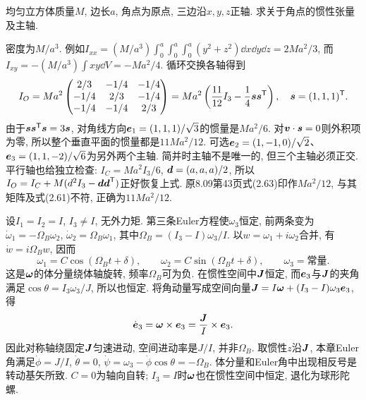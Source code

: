 \begin{example}
均匀立方体质量$M$, 边长$a$, 角点为原点, 三边沿$x,y,z$正轴. 求关于角点的惯性张量及主轴.
\end{example}
\begin{solution}
密度为$M/a^3$. 例如$I_{xx}=(M/a^3)\int_0^a\int_0^a\int_0^a(y^2+z^2)\dd x\dd y\dd z=2Ma^2/3$, 而$I_{xy}=-(M/a^3)\int xy\dd V=-Ma^2/4$. 循环交换各轴得到
\[
I_O=Ma^2\begin{pmatrix}2/3&-1/4&-1/4\\-1/4&2/3&-1/4\\-1/4&-1/4&2/3\end{pmatrix}
=Ma^2\left(\frac{11}{12}I_3-\frac14\boldsymbol{s}\boldsymbol{s}^{\mathsf T}\right),\quad
\boldsymbol{s}=(1,1,1)^{\mathsf T}.
\]
由于$\boldsymbol{s}\boldsymbol{s}^{\mathsf T}\boldsymbol{s}=3\boldsymbol{s}$, 对角线方向$\boldsymbol{e}_1=(1,1,1)/\sqrt3$的惯量是$Ma^2/6$. 对$\boldsymbol{v}\cdot\boldsymbol{s}=0$则外积项为零, 所以整个垂直平面的惯量都是$11Ma^2/12$. 可选$\boldsymbol{e}_2=(1,-1,0)/\sqrt2$、$\boldsymbol{e}_3=(1,1,-2)/\sqrt6$为另外两个主轴. 简并时主轴不是唯一的, 但三个主轴必须正交. 平行轴也给独立检查: $I_C=Ma^2I_3/6$, $\boldsymbol{d}=(a,a,a)/2$, 所以$I_O=I_C+M(d^2I_3-\boldsymbol{d}\boldsymbol{d}^{\mathsf T})$正好恢复上式. 原8.09第43页式(2.63)印作$Ma^2/12$, 与其矩阵及式(2.61)不符, 正确为$11Ma^2/12$.
\end{solution}

设$I_1=I_2=I$, $I_3\ne I$, 无外力矩. 第三条Euler方程使$\omega_3$恒定, 前两条变为$\dot\omega_1=-\Omega_B\omega_2$, $\dot\omega_2=\Omega_B\omega_1$, 其中$\Omega_B=(I_3-I)\omega_3/I$. 以$w=\omega_1+i\omega_2$合并, 有$\dot w=i\Omega_Bw$, 因而
\[
\omega_1=C\cos(\Omega_Bt+\delta),\qquad
\omega_2=C\sin(\Omega_Bt+\delta),\qquad\omega_3=\text{常量}.
\]
这是$\boldsymbol{\omega}$的体分量绕体轴旋转, 频率$\Omega_B$可为负. 在惯性空间中$\boldsymbol{J}$恒定, 而$\boldsymbol{e}_3$与$\boldsymbol{J}$的夹角满足$\cos\theta=I_3\omega_3/J$, 所以也恒定. 将角动量写成空间向量$\boldsymbol{J}=I\boldsymbol{\omega}+(I_3-I)\omega_3\boldsymbol{e}_3$, 得
\[
\dot{\boldsymbol{e}}_3=\boldsymbol{\omega}\times\boldsymbol{e}_3
=\frac{\boldsymbol{J}}{I}\times\boldsymbol{e}_3.
\]
因此对称轴绕固定$\boldsymbol{J}$匀速进动, 空间进动率是$J/I$, 并非$\Omega_B$. 取惯性$z$沿$\boldsymbol{J}$, 本章Euler角满足$\dot\phi=J/I$, $\dot\theta=0$, $\dot\psi=\omega_3-\dot\phi\cos\theta=-\Omega_B$. 体分量和Euler角中出现相反号是转动基矢所致. $C=0$为轴向自转; $I_3=I$时$\boldsymbol{\omega}$也在惯性空间中恒定, 退化为球形陀螺.

